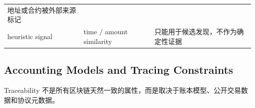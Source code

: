 \documentclass[12pt,a4paper]{ctexart}
\begin{document}
\begin{longtable}[]{@{}lll@{}}
\begin{minipage}[t]{0.30\columnwidth}
地址或合约被外部来源标记\strut
\end{minipage}\tabularnewline
\begin{minipage}[t]{0.30\columnwidth}\raggedright
heuristic signal\strut
\end{minipage} & \begin{minipage}[t]{0.30\columnwidth}\raggedright
time / amount similarity\strut
\end{minipage} & \begin{minipage}[t]{0.30\columnwidth}\raggedright
只能用于候选发现，不作为确定性证据\strut
\end{minipage}\tabularnewline
\bottomrule
\end{longtable}

\hypertarget{accounting-models-and-tracing-constraints}{%
\subsection{Accounting Models and Tracing
Constraints}\label{accounting-models-and-tracing-constraints}}

Traceability
不是所有区块链天然一致的属性，而是取决于账本模型、公开交易数据和协议元数据。
\end{document}
